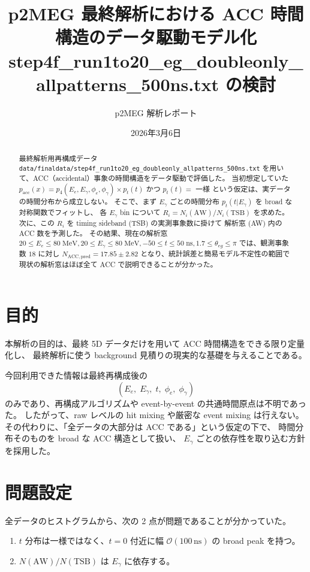\documentclass[a4paper,11pt]{jsarticle}
\title{p2MEG 最終解析における ACC 時間構造のデータ駆動モデル化\\
step4f\_run1to20\_eg\_doubleonly\_allpatterns\_500ns.txt の検討}
\author{p2MEG 解析レポート}
\date{2026年3月6日}
\begin{document}
\maketitle

\begin{abstract}
最終解析用再構成データ
\texttt{data/finaldata/step4f\_run1to20\_eg\_doubleonly\_allpatterns\_500ns.txt}
を用いて、ACC（accidental）事象の時間構造をデータ駆動で評価した。
当初想定していた
\(
p_{\mathrm{acc}}(x)=p_4(E_e,E_\gamma,\phi_e,\phi_\gamma)\times p_t(t)
\)
かつ \(p_t(t)=\) 一様
という仮定は、実データの時間分布から成立しない。
そこで、まず \(E_\gamma\) ごとの時間分布 \(p_t(t|E_\gamma)\) を broad な対称関数でフィットし、
各 \(E_\gamma\) bin について
\(
R_i = N_i(\mathrm{AW}) / N_i(\mathrm{TSB})
\)
を求めた。
次に、この \(R_i\) を timing sideband (TSB) の実測事象数に掛けて
解析窓 (AW) 内の ACC 数を予測した。
その結果、現在の解析窓
\(
20\le E_e\le 80\;\mathrm{MeV},
20\le E_\gamma\le 80\;\mathrm{MeV},
-50\le t\le 50\;\mathrm{ns},
1.7\le \theta_{eg}\le \pi
\)
では、観測事象数 \(18\) に対し
\(
N_{\mathrm{ACC,pred}} = 17.85 \pm 2.82
\)
となり、統計誤差と簡易モデル不定性の範囲で
現状の解析窓はほぼ全て ACC で説明できることが分かった。
\end{abstract}

\section{目的}
本解析の目的は、最終 5D データだけを用いて ACC 時間構造をできる限り定量化し、
最終解析に使う background 見積りの現実的な基礎を与えることである。

今回利用できた情報は最終再構成後の
\[
(E_e,\; E_\gamma,\; t,\; \phi_e,\; \phi_\gamma)
\]
のみであり、再構成アルゴリズムや event-by-event の共通時間原点は不明であった。
したがって、raw レベルの hit mixing や厳密な event mixing は行えない。
その代わりに、「全データの大部分は ACC である」という仮定の下で、
時間分布そのものを broad な ACC 構造として扱い、
\(E_\gamma\) ごとの依存性を取り込む方針を採用した。

\section{問題設定}
全データのヒストグラムから、次の 2 点が問題であることが分かっていた。

\begin{enumerate}
  \item \(t\) 分布は一様ではなく、\(t=0\) 付近に幅 \(\mathcal{O}(100\,\mathrm{ns})\) の broad peak を持つ。
  \item \(N(\mathrm{AW})/N(\mathrm{TSB})\) は \(E_\gamma\) に依存する。
\end{enumerate}
\end{document}
